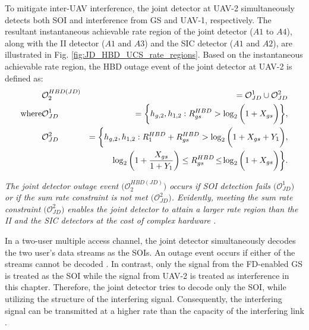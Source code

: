 To mitigate inter-UAV interference, the joint detector at UAV-2 simultaneously detects both SOI and interference from GS and UAV-1, respectively. The resultant instantaneous achievable rate region of the joint detector ($A1$ to $A4$), along with the II detector ($A1$ and $A3$) and the SIC detector ($A1$ and $A2$), are illustrated in Fig. \ref{fig:JD_HBD_UCS_rate_regions}. Based on the instantaneous achievable rate region, the HBD outage event of the joint detector at UAV-2 is defined as:
\begin{eqnarray}
							& \mathcal{O}_{2}^{HBD(JD)} & = \mathcal{O}_{JD}^{1} \cup \mathcal{O}_{JD}^{2} \label{JD_HBD_UCS_outage_JD_overall} \\
\text{where}	& \mathcal{O}_{JD}^{1} 			& = \bigg\{h_{g,2}, h_{1,2} : R_{gs}^{HBD} > \log_{2}\bigg(1+X_{gs}\bigg)\bigg\}, \label{JD_HBD_UCS_outage_JD_soi}\\
							& \mathcal{O}_{JD}^{2} 			& = \bigg\{h_{g,2}, h_{1,2} : R_{1}^{HBD} + R_{gs}^{HBD} > \log_{2}\bigg(1+X_{gs}+Y_{1} \bigg), \nonumber\\
							&														& \hspace{0.5cm} \log_{2}\bigg(1+\frac{X_{gs}}{1+Y_{1}} \bigg) \leq R_{gs}^{HBD} \hspace{-0.05cm} \leq \hspace{-0.05cm} \log_{2}\bigg(1+X_{gs}\bigg) \bigg\} \label{JD_HBD_UCS_outage_JD_int}.
\end{eqnarray}
\begin{remark} \label{remark_jd}
\textit{The joint detector outage event $\big(\mathcal{O}_{2}^{HBD(JD)}\big)$ occurs if SOI detection fails $\big(\mathcal{O}_{JD}^{1}\big)$ or if the sum rate constraint is not met $\big(\mathcal{O}_{JD}^{2}\big)$. Evidently, meeting the sum rate constraint $\big(\mathcal{O}_{JD}^{2}\big)$ enables the joint detector to attain a larger rate region than the II and the SIC detectors at the cost of complex hardware \cite{shubhi2017joint,blomer2009transmission}.}
\end{remark}

In a two-user multiple access channel, the joint detector simultaneously decodes the two user's data streams as the SOIs. An outage event occurs if either of the streams cannot be decoded \cite{narasimhan2007individual}. In contrast, only the signal from the FD-enabled GS is treated as the SOI while the signal from UAV-2 is treated as interference in this chapter. Therefore, the joint detector tries to decode only the SOI, while utilizing the structure of the interfering signal. Consequently, the interfering signal can be transmitted at a higher rate than the capacity of the interfering link \cite{bennatan2014soft}.

